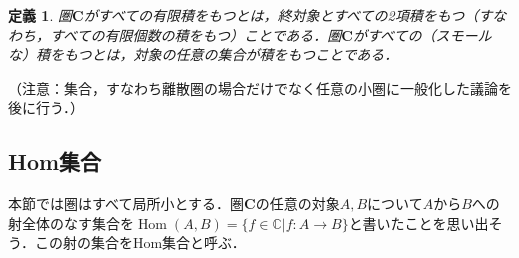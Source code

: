 \documentclass[dvipdfmx,a4j,10pt]{jsarticle}
\theoremstyle{mystyle1}
\newtheorem{dfn}{定義}[section]
\theoremstyle{mystyle2}
\DeclareMathOperator{\Hom}{Hom}
\begin{document}
	\begin{dfn}
		圏$\mathbf{C}$がすべての有限積をもつとは，終対象とすべての2項積をもつ（すなわち，すべての有限個数の積をもつ）ことである．圏$\mathbf{C}$がすべての（スモールな）積をもつとは，対象の任意の集合が積をもつことである．
	\end{dfn}

	（注意：集合，すなわち離散圏の場合だけでなく任意の小圏に一般化した議論を後に行う．）

	\subsection{Hom集合}

	本節では圏はすべて局所小とする．圏$\mathbf{C}$の任意の対象$A,B$について$A$から$B$への射全体のなす集合を$\Hom(A,B)=\{f\in\mathbb{C}|f:A\to B\}$と書いたことを思い出そう．この射の集合をHom集合と呼ぶ．
\end{document}
